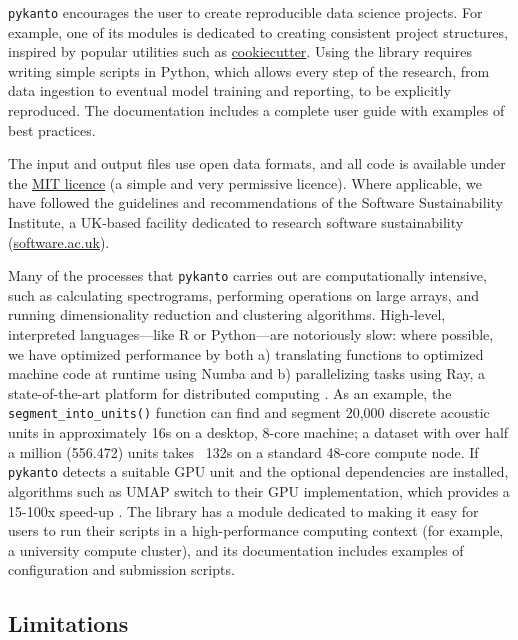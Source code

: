 \texttt{pykanto} encourages the user to create reproducible data science
projects. For example, one of its modules is dedicated to creating consistent
project structures, inspired by popular utilities such as
\href{https://github.com/cookiecutter/cookiecutter}{cookiecutter}. Using the
library requires writing simple scripts in Python, which allows every step of
the research, from data ingestion to eventual model training and reporting, to be
explicitly reproduced. The documentation includes a complete user guide with
examples of best practices.

The input and output files use open data formats, and all code is available
under the \href{https://choosealicense.com/licenses/mit/}{MIT licence} (a simple
and very permissive licence). Where applicable, we have followed the guidelines
and recommendations of the Software Sustainability Institute, a UK-based
facility dedicated to research software sustainability
(\href{https://www.software.ac.uk/}{software.ac.uk}).



Many of the processes that \texttt{pykanto} carries out are computationally
intensive, such as calculating spectrograms, performing operations on large
arrays, and running dimensionality reduction and clustering algorithms.
High-level, interpreted languages---like R or Python---are notoriously slow: where
possible, we have optimized performance by both a) translating functions to
optimized machine code at runtime using Numba \parencite{lam2015} and b)
parallelizing tasks using Ray, a state-of-the-art platform for distributed
computing \parencite{moritz2018}. As an example, the \texttt{segment\_into\_units()}
function can find and segment 20,000 discrete acoustic units in approximately
16s on a desktop, 8-core machine; a dataset with over half a million (556.472)
units takes ~132s on a standard 48-core compute node. If \texttt{pykanto} detects a
suitable GPU unit and the optional dependencies are installed, algorithms such
as UMAP \parencite{mcinnes2018} switch to their GPU implementation, which provides a
15-100x speed-up \parencite{nolet2021, raschka2020}. The library has a module
dedicated to making it easy for users to run their scripts in a high-performance
computing context (for example, a university compute cluster), and its
documentation includes examples of configuration and submission scripts.

\subsection{Limitations}

